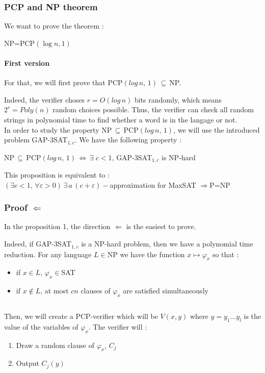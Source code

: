 \subsubsection{PCP and NP theorem}

We want to prove the theorem :

\begin{theorem}
NP=PCP$(\log n,1)$
\end{theorem}

\paragraph{First version}
For that, we will first prove that PCP$(log\,n,\,1)\,\subseteq\,$NP.

Indeed, the verifier choses $r=O(log\,n)$ bits randomly, which means $2^r=Poly(n)$ random choices possible. Thus, the verifier can check all random strings in polynomial time to find whether a word is in the langage or not.
\\

In order to study the property NP$\,\subseteq\,$PCP$(log\,n,\,1)$, we will use the introduced problem GAP-3SAT$_{1,c}$. We have the following property :
\begin{prop}
NP$ \, \subseteq \, $PCP$(log \, n, \, 1) \, \Longleftrightarrow \, \exists $ $c < 1, \, $GAP-3SAT$_{1,c}$ is NP-hard
\end{prop}
This proposition is equivalent to :\\
$(\exists c <1,\,\forall \varepsilon > 0)\,\exists\,a\,(c+\varepsilon)-$approximation for MaxSAT $\Longrightarrow $P=NP

\subsubsection{Proof $\Longleftarrow$}

In the proposition 1, the direction $\Longleftarrow$ is the easiest to prove.

Indeed, if GAP-3SAT$_{1,c}$ is a NP-hard problem, then we have a polynomial time reduction. For any language $L \in $NP we have the function $x\mapsto \varphi_{x}$ so that :
\begin{itemize}
\item if $x \in L,\,\varphi_{x}\in $SAT
\item if $x \notin L$, at most $cn$ clauses of $\varphi_{x}$ are satisfied simultaneously
\end{itemize}
$ $

Then, we will create a PCP-verifier which will be $V(x,y)$ where $y=y_{1}...y_{l}$ is the value of the variables of $\varphi_{x}$. The verifier will :
\begin{enumerate}
\item Draw a random clause of $\varphi_{x}$, $C_{j}$
\item Output $C_{j}(y)$
\end{enumerate}
$ $

